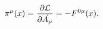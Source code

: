 \begin{equation}
 \pi^\mu(x) = \frac{\partial {\cal{L}}}{\partial
 \dot{A_\mu}}=-F^{0\mu}(x).
 \label{a38}
 \end{equation}

